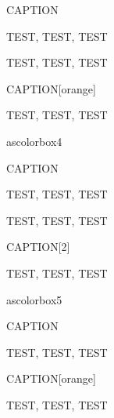 \begin{ascolorbox3}{CAPTION}

TEST, TEST, TEST

\end{ascolorbox3}

\begin{ascolorbox3}{}

TEST, TEST, TEST

\end{ascolorbox3}

\begin{ascolorbox3}{CAPTION}[orange]

TEST, TEST, TEST

\end{ascolorbox3}

ascolorbox4

\begin{ascolorbox4}{CAPTION}

TEST, TEST, TEST

\end{ascolorbox4}

\begin{ascolorbox4}{}

TEST, TEST, TEST

\end{ascolorbox4}

\begin{ascolorbox4}{CAPTION}[2]

TEST, TEST, TEST

\end{ascolorbox4}

ascolorbox5

\begin{ascolorbox5}{CAPTION}

TEST, TEST, TEST

\end{ascolorbox5}




\begin{ascolorbox5}{CAPTION}[orange]

TEST, TEST, TEST

\end{ascolorbox5}

